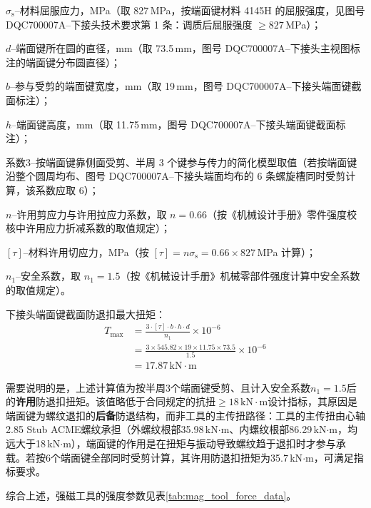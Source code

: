 $\sigma_{\mathrm{s}}$--材料屈服应力，MPa（取 827\,MPa，按端面键材料 4145H 的屈服强度，见图号 DQC700007A--下接头技术要求第 1 条：调质后屈服强度 $\ge 827$\,MPa）；

$d$--端面键所在圆的直径，mm（取 73.5\,mm，图号 DQC700007A--下接头主视图标注的端面键分布圆直径）；

$b$--参与受剪的端面键宽度，mm（取 19\,mm，图号 DQC700007A--下接头端面键截面标注）；

$h$--端面键高度，mm（取 11.75\,mm，图号 DQC700007A--下接头端面键截面标注）；

系数3--按端面键靠侧面受剪、半周 3 个键参与传力的简化模型取值（若按端面键沿整个圆周均布、图号 DQC700007A--下接头端面均布的 6 条螺旋槽同时受剪计算，该系数应取 6）；

$n$--许用剪应力与许用拉应力系数，取 $n = 0.66$（按《机械设计手册》零件强度校核中许用应力折减系数的取值规定\cite{ref26}）；

$[\tau]$--材料许用切应力，MPa（按 $[\tau]=n\sigma_{\mathrm{s}} = 0.66\times 827$\,MPa 计算）；

$n_1$--安全系数，取 $n_1 = 1.5$（按《机械设计手册》机械零部件强度计算中安全系数的取值规定\cite{ref26}）。

下接头端面键截面防退扣最大扭矩：
\begin{equation}
    \begin{aligned}
        T_{\max} &= \frac{3 \cdot [\tau] \cdot b \cdot h \cdot d}{n_1} \times 10^{-6} \\
                 &= \frac{3 \times 545.82 \times 19 \times 11.75 \times 73.5}{1.5} \times 10^{-6} \\
                 &= 17.87\,\text{kN}\cdot\text{m}
    \end{aligned}
\end{equation}

需要说明的是，上述计算值为按半周3个端面键受剪、且计入安全系数$n_1 = 1.5$后的\textbf{许用}防退扣扭矩。该值略低于合同规定的抗扭$\ge 18\,\text{kN}\cdot\text{m}$设计指标，其原因是端面键为螺纹退扣的\textbf{后备}防退结构，而非工具的主传扭路径：工具的主传扭由心轴2.85 Stub ACME螺纹承担（外螺纹根部35.98\,kN$\cdot$m、内螺纹根部86.29\,kN$\cdot$m，均远大于18\,kN$\cdot$m），端面键的作用是在扭矩与振动导致螺纹趋于退扣时才参与承载。若按6个端面键全部同时受剪计算，其许用防退扣扭矩为35.7\,kN$\cdot$m，可满足指标要求。


综合上述，强磁工具的强度参数见表\ref{tab:mag_tool_force_data}。


